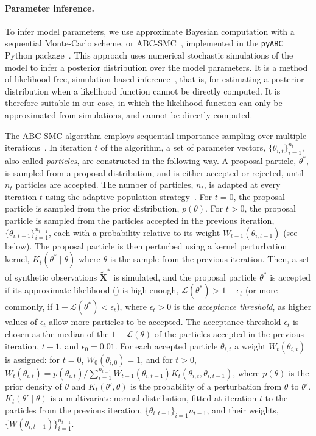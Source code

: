 \documentclass[12pt]{extarticle}
\let\vec\mathbf
\newcommand{\likelihood}{\mathcal{L}}
\begin{document}
\paragraph{Parameter inference.} To infer model parameters, we use approximate Bayesian computation with a sequential Monte-Carlo scheme, or ABC-SMC~\citep{Sisson2009}, implemented in the \texttt{pyABC} Python package~\citep[\href{https://pyabc.readthedocs.io}{pyabc.readthedocs.io}]{Klinger2018}.
This approach uses numerical stochastic simulations of the model to infer a posterior distribution over the model parameters. It is a method of likelihood-free, simulation-based inference~\citep{Cranmer2020}, that is, for estimating a posterior distribution when a likelihood function cannot be directly computed. It is therefore suitable in our case, in which the likelihood function can only be approximated from simulations, and cannot be directly computed. 

The ABC-SMC algorithm employs sequential importance sampling over multiple iterations~\citep{Toni2009, Klinger2017, Syga2021}.
In iteration $t$ of the algorithm, a set of parameter vectors, $\{\theta_{i,t}\}_{i=1}^{n_t}$, also called \emph{particles}, are constructed in the following way.
A proposal particle, $\theta^*$, is sampled from a proposal distribution, and is either accepted or rejected, until $n_t$ particles are accepted.
The number of particles, $n_t$, is adapted at every iteration $t$ using the adaptive population strategy~\citep[\href{https://pyabc.readthedocs.io}{pyabc.readthedocs.io}]{Klinger2018}.
For $t=0$, the proposal particle is sampled from the prior distribution, $p(\theta)$.
For $t>0$, the proposal particle is sampled from the particles accepted in the previous iteration, $\{\theta_{i,t-1}\}_{i=1}^{n_{t-1}}$, each with a probability relative to its weight $W_{t-1}(\theta_{i,t-1})$ (see below). The proposal particle is then perturbed using a kernel perturbation kernel, $K_t(\theta^* \mid \theta)$ where $\theta$ is the sample from the previous iteration.
Then, a set of synthetic observations $\tilde{\vec X}^*$ is simulated, and the proposal particle $\theta^*$ is accepted if its approximate likelihood () is high enough, $\likelihood(\theta^*)>1-\epsilon_t$ (or more commonly, if $1-\likelihood(\theta^*) < \epsilon_t$), where $\epsilon_t>0$ is the \emph{acceptance threshold}, as higher values of $\epsilon_t$ allow more particles to be accepted. 
The acceptance threshold $\epsilon_t$ is chosen as the median of the $1-\likelihood(\theta)$ of the particles accepted in the previous iteration, $t-1$, and $\epsilon_0=0.01$. 
For each accepted particle $\theta_{i,t}$ a weight $W_t(\theta_{i,t})$ is assigned: for $t=0$, $W_0(\theta_{i,0})=1$, and for $t>0$, 
$W_t(\theta_{i,t}) = p(\theta_{i,t}) / \sum_{i=1}^{n_{t-1}}{W_{t-1}(\theta_{i,t-1}) K_t(\theta_{i,t}, \theta_{i,t-1})}$, where $p(\theta)$ is the prior density of $\theta$ and $K_t(\theta', \theta)$ is the probability of a perturbation from $\theta$ to $\theta'$.
$K_t(\theta' \mid \theta)$ is a multivariate normal distribution, fitted at iteration $t$ to the particles from the previous iteration, \{$\theta_{i,t-1}\}_{i=1}{n_{t-1}}$, and their weights, $\{W(\theta_{i,t-1})\}_{i=1}^{n_{t-1}}$.
\end{document}
